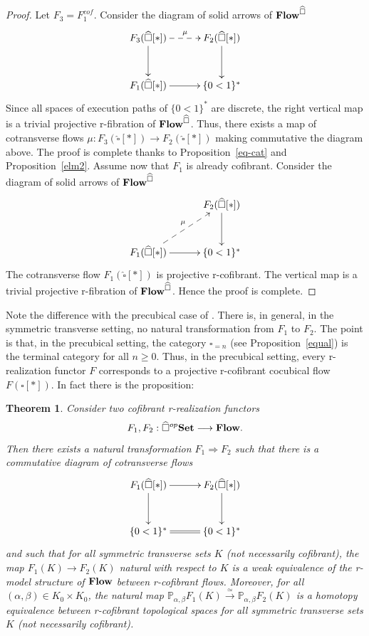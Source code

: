 \documentclass[a4paper,12pt]{amsart}
\makeatletter
\newcommand{\p}{\times}
\newtheorem{thm}{Theorem}[section]
\newcommand{\bth}{\begin{thm}}
\renewcommand{\eth}{\end{thm}}
\newcommand{\bpf}{\begin{proof}}
\newcommand{\epf}{\end{proof}}
\theoremstyle{definition}
\newcommand{\fr}[1]{\ar@{->}[r]^-{#1}}
\newcommand{\fd}[1]{\ar@{->}[d]_-{#1}}
\renewcommand{\geq}{\geqslant}
\newcommand{\brm}[1]{{\rm{\mathbf{#1}}}}
\newcommand{\dtop}{{\brm{Flow}}}
\newcommand{\set}{{\brm{Set}}}
\renewcommand{\P}{\mathbb{P}}
\makeatother
\begin{document}
\bpf
Let $F_3=F_1^{cof}$. Consider the diagram of solid arrows of $\dtop^{\widehat{\square}}$
\[
\xymatrix@C=3em@R=3em
{
	F_3(\widehat{\square}[*]) \ar@{-->}[r]^-{\mu} \fd{} & F_2(\widehat{\square}[*]) \fd{} \\
	F_1(\widehat{\square}[*]) \fr{} & \{0<1\}^*
}
\]
Since all spaces of execution paths of $\{0<1\}^*$ are discrete, the right vertical map is a trivial projective r-fibration of $\dtop^{\widehat{\square}}$. Thus, there exists a map of cotransverse flows $\mu:F_3(\widehat{\square}[*])\to F_2(\widehat{\square}[*])$ making commutative the diagram above. The proof is complete thanks to Proposition~\ref{eq-cat} and Proposition~\ref{elm2}. Assume now that $F_1$ is already cofibrant. Consider the diagram of solid arrows of $\dtop^{\widehat{\square}}$
\[
\xymatrix@C=3em@R=3em
{
	 & F_2(\widehat{\square}[*]) \fd{} \\
	F_1(\widehat{\square}[*]) \ar@{-->}[ru]^-{\mu}\fr{} & \{0<1\}^*
}
\]
The cotransverse flow $F_1(\widehat{\square}[*])$ is projective r-cofibrant. The vertical map is a trivial projective r-fibration of $\dtop^{\widehat{\square}}$. Hence the proof is complete.
\epf



Note the difference with the precubical case of \cite[Theorem~3.8]{NaturalRealization}. There is, in general, in the symmetric transverse setting, no natural transformation from $F_1$ to $F_2$. The point is that, in the precubical setting, the category $\square_{=n}$ (see Proposition~\ref{equal}) is the terminal category for all $n\geq 0$. Thus, in the precubical setting, every r-realization functor $F$ corresponds to a projective r-cofibrant cocubical flow $F(\square[*])$. In fact there is the proposition: 

\bth \label{cofibrant-case}
Consider two cofibrant r-realization functors \[F_1,F_2:\widehat{\square}^{op}\set \longrightarrow \dtop.\] Then there exists a natural transformation $F_1\Rightarrow F_2$ such that there is a commutative diagram of cotransverse flows 
\[
\xymatrix@C=3em@R=3em
{
	 F_1(\widehat{\square}[*]) \fd{}\fr{} & F_2(\widehat{\square}[*]) \fd{} \\
	 {\{0<1\}^*} \ar@{=}[r] & {\{0<1\}^*}
}
\]
and such that for all symmetric transverse sets $K$ (not necessarily cofibrant), the map $F_1(K)\to F_2(K)$ natural with respect to $K$ is a weak equivalence of the r-model structure of $\dtop$ between r-cofibrant flows. Moreover, for all $(\alpha,\beta)\in K_0\p K_0$, the natural map $\P_{\alpha,\beta}F_1(K)\stackrel{\simeq}\longrightarrow \P_{\alpha,\beta}F_2(K)$ is a homotopy equivalence between r-cofibrant topological spaces for all symmetric transverse sets $K$ (not necessarily cofibrant). 
\eth
\end{document}
